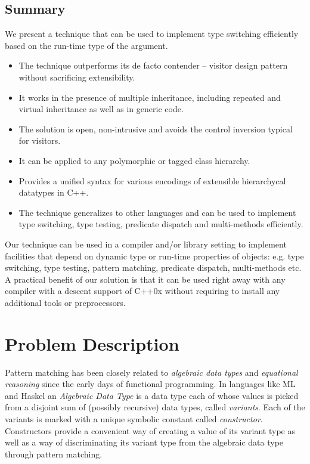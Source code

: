 \documentclass[preprint]{sigplanconf}
\begin{document}
\subsection{Summary}

We present a technique that can be used to implement type switching efficiently 
based on the run-time type of the argument.

  \begin{itemize}
  \setlength{\itemsep}{0pt}
  \setlength{\parskip}{0pt}
  \item The technique outperforms its de facto contender -- visitor design 
        pattern without sacrificing extensibility.
  \item It works in the presence of multiple inheritance, including repeated and 
        virtual inheritance as well as in generic code.
  \item The solution is open, non-intrusive and avoids the control inversion 
        typical for visitors. 
  \item It can be applied to any polymorphic or tagged class hierarchy.
  \item Provides a unified syntax for various encodings of extensible 
        hierarchycal datatypes in C++.
  \item The technique generalizes to other languages and can be used to 
        implement type switching, type testing, predicate dispatch and 
        multi-methods efficiently.
  \end{itemize}

\noindent
Our technique can be used in a compiler and/or library setting to implement 
facilities that depend on dynamic type or run-time properties of objects: e.g. 
type switching, type testing, pattern matching, predicate dispatch, 
multi-methods etc. A practical benefit of our solution is that it 
can be used right away with any compiler with a descent support of C++0x without
requiring to install any additional tools or preprocessors.

\section{Problem Description} %
\label{sec:probl}

Pattern matching has been closely related to \emph{algebraic data types} and 
\emph{equational reasoning} since the early days of functional programming.
In languages like ML and Haskel an \emph{Algebraic Data Type} is a data type 
each of whose values is picked from a disjoint sum of (possibly recursive) data 
types, called \emph{variants}. Each of the variants is marked with a unique 
symbolic constant called \emph{constructor}. Constructors provide a convenient 
way of creating a value of its variant type as well as a way of discriminating 
its variant type from the algebraic data type through pattern matching.
\end{document}
